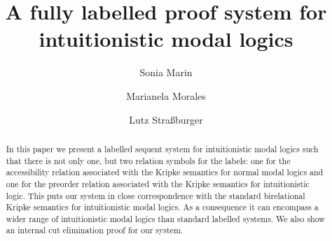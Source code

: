 \documentclass[a4paper]{article}
\theoremstyle{plain}
\theoremstyle{definition}
\newcommand{\marianela}[1]{{\color{purple}[Marianela: #1]}}
\newcommand{\todo}[1]{{\color{red}[TODO: #1]}}
\begin{document}
  \title{A fully labelled proof system for intuitionistic modal logics}
  \author{Sonia Marin \and %
      Marianela Morales %
 \and
        Lutz Stra{\ss}burger }

  \maketitle
  
 \begin{abstract}

   In this paper we present a labelled sequent system for
   intuitionistic modal logics such that there is not only one, but
   two relation symbols for the labels: one for the accessibility
   relation associated with the Kripke semantics for normal modal logics and
   one for the preorder relation associated with the Kripke semantics
   for intuitionistic logic.
   This puts our system in close correspondence with the standard
   birelational Kripke semantics for intuitionistic modal logics. As a
   consequence it can encompass a wider range of intuitionistic modal
   logics than standard labelled systems.
   We also show an internal cut elimination proof for our system.

  \end{abstract}


\end{document}
